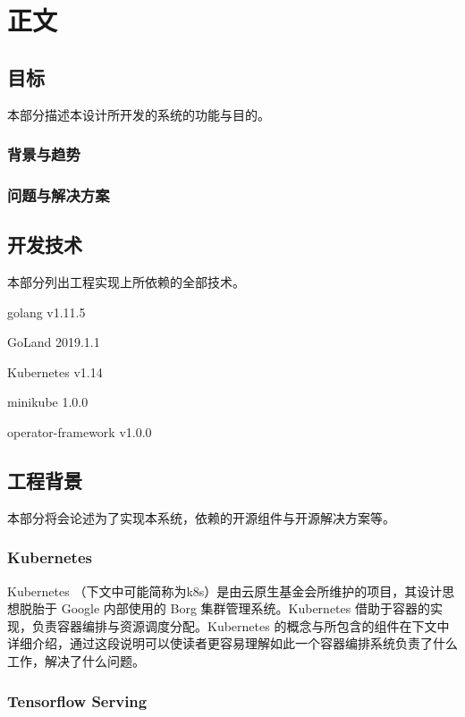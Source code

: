 
\section{正文}

\subsection{目标}

本部分描述本设计所开发的系统的功能与目的。

\subsubsection{背景与趋势}

\subsubsection{问题与解决方案}

\subsection{开发技术}

本部分列出工程实现上所依赖的全部技术。

golang v1.11.5

GoLand 2019.1.1

Kubernetes v1.14

minikube 1.0.0

operator-framework v1.0.0

\subsection{工程背景}

本部分将会论述为了实现本系统，依赖的开源组件与开源解决方案等。

\subsubsection{Kubernetes}

Kubernetes （下文中可能简称为k8s）是由云原生基金会所维护的项目，其设计思想脱胎于 Google 内部使用的 Borg 集群管理系统。Kubernetes 借助于容器的实现，负责容器编排与资源调度分配。Kubernetes 的概念与所包含的组件在下文中详细介绍，通过这段说明可以使读者更容易理解如此一个容器编排系统负责了什么工作，解决了什么问题。

\subsubsection{Tensorflow Serving}

